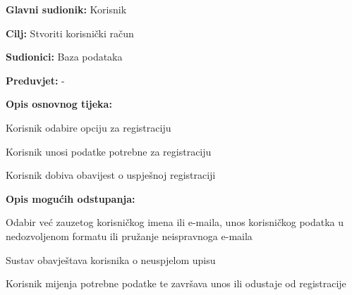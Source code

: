 					\noindent {}
					\begin{packed_item}
						
						\item \textbf{Glavni sudionik: } Korisnik
						\item  \textbf{Cilj:} Stvoriti korisnički račun
						\item  \textbf{Sudionici:} Baza podataka
						\item  \textbf{Preduvjet:} -
						\item  \textbf{Opis osnovnog tijeka:}
						
						\item[] \begin{packed_enum}
							
							\item Korisnik odabire opciju za registraciju
							\item Korisnik unosi podatke potrebne za registraciju
							\item Korisnik dobiva obavijest o uspješnoj registraciji
						\end{packed_enum}
						
						\item  \textbf{Opis mogućih odstupanja:}
						
						\item[] \begin{packed_item}
							
							\item[2.a] Odabir već zauzetog korisničkog imena ili e-maila, unos korisničkog podatka u nedozvoljenom formatu ili pružanje neispravnoga e-maila
							
							\item[] \begin{packed_enum}
								
								\item Sustav obavještava korisnika o neuspjelom upisu
								\item Korisnik mijenja potrebne podatke te završava unos ili odustaje od registracije
								
								
							\end{packed_enum}
							
						\end{packed_item}
					\end{packed_item}
				
